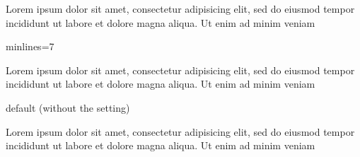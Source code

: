 \documentclass{article}
\begin{document}

Lorem ipsum dolor sit amet, consectetur adipisicing elit, sed do eiusmod
tempor incididunt ut labore et dolore magna aliqua. Ut enim ad minim
veniam

\begin{clozepar}[minlines=7]
minlines=7
\end{clozepar}

Lorem ipsum dolor sit amet, consectetur adipisicing elit, sed do eiusmod
tempor incididunt ut labore et dolore magna aliqua. Ut enim ad minim
veniam

\begin{clozepar}
default (without the setting)
\end{clozepar}

Lorem ipsum dolor sit amet, consectetur adipisicing elit, sed do eiusmod
tempor incididunt ut labore et dolore magna aliqua. Ut enim ad minim
veniam
\end{document}
